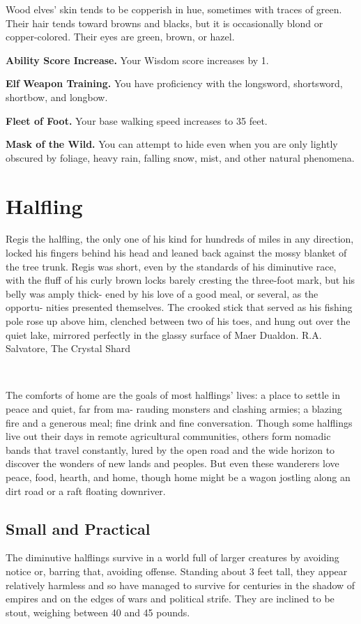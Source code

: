 Wood elves’ skin tends to be copperish in hue, sometimes with traces of green. Their hair tends toward browns and blacks, but it is occasionally blond or copper-colored. Their eyes are green, brown, or hazel.

\textbf{Ability Score Increase.} Your Wisdom score increases by 1.

\textbf{Elf Weapon Training.} You have proficiency with the longsword, shortsword, shortbow, and longbow.

\textbf{Fleet of Foot.} Your base walking speed increases to 35 feet.

\textbf{Mask of the Wild.} You can attempt to hide even when you are only lightly obscured by foliage, heavy rain, falling snow, mist, and other natural phenomena.

\section{Halfling}

\DndQuote%
  {Regis the halfling, the only one of his kind for}
  {hundreds of miles in any direction, locked his fingers behind his head and leaned back against the mossy blanket of the tree trunk. Regis was short, even by the standards of his diminutive race, with the fluff of his curly brown locks barely cresting the three-foot mark, but his belly was amply thick- ened by his love of a good meal, or several, as the opportu- nities presented themselves. The crooked stick that served as his fishing pole rose up above him, clenched between two of his toes, and hung out over the quiet lake, mirrored perfectly in the glassy surface of Maer Dualdon.}
  {R.A. Salvatore, The Crystal Shard}

\ \newline
\par\noindent The comforts of home are the goals of most halflings’ lives: a place to settle in peace and quiet, far from ma- rauding monsters and clashing armies; a blazing fire and a generous meal; fine drink and fine conversation. Though some halflings live out their days in remote agricultural communities, others form nomadic bands that travel constantly, lured by the open road and the wide horizon to discover the wonders of new lands and peoples. But even these wanderers love peace, food, hearth, and home, though home might be a wagon jostling along an dirt road or a raft floating downriver.

\subsection{Small and Practical}
The diminutive halflings survive in a world full of larger creatures by avoiding notice or, barring that, avoiding offense. Standing about 3 feet tall, they appear relatively harmless and so have managed to survive for centuries in the shadow of empires and on the edges of wars and political strife. They are inclined to be stout, weighing between 40 and 45 pounds.


